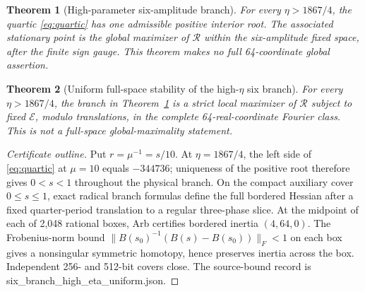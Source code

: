 \documentclass[11pt]{article}
\newtheorem{theorem}{Theorem}[section]
\newcommand{\E}{\mathcal{E}}
\newcommand{\rate}{\mathcal{R}}
\begin{document}
\begin{theorem}[High-parameter six-amplitude branch]\label{thm:highsix}
For every $\eta>1867/4$, the quartic \eqref{eq:quartic} has one admissible
positive interior root. The associated stationary point is the global
maximizer of $\rate$ within the six-amplitude fixed space, after the finite
sign gauge. This theorem makes no full 64-coordinate global assertion.
\end{theorem}

\begin{theorem}[Uniform full-space stability of the high-$\eta$ six branch]
\label{thm:uniformsix}
For every $\eta>1867/4$, the branch in Theorem~\ref{thm:highsix} is a
strict local maximizer of $\rate$ subject to fixed $\E$, modulo translations,
in the complete 64-real-coordinate Fourier class. This is not a full-space
global-maximality statement.
\end{theorem}

\begin{proof}[Certificate outline]
Put $r=\mu^{-1}=s/10$. At $\eta=1867/4$, the left side of
\eqref{eq:quartic} at $\mu=10$ equals $-344736$; uniqueness of the positive
root therefore gives $0<s<1$ throughout the physical branch. On the compact
auxiliary cover $0\leq s\leq1$, exact radical branch formulas define the
full bordered Hessian after a fixed quarter-period translation to a regular
three-phase slice. At the midpoint of each of 2,048 rational boxes, Arb
certifies bordered inertia $(4,64,0)$. The Frobenius-norm bound
$\|B(s_0)^{-1}(B(s)-B(s_0))\|_F<1$ on each box gives a nonsingular symmetric
homotopy, hence preserves inertia across the box. Independent 256- and
512-bit covers close. The source-bound record is
{\ttfamily six\_branch\_high\_eta\_uniform.json}.
\end{proof}
\end{document}
